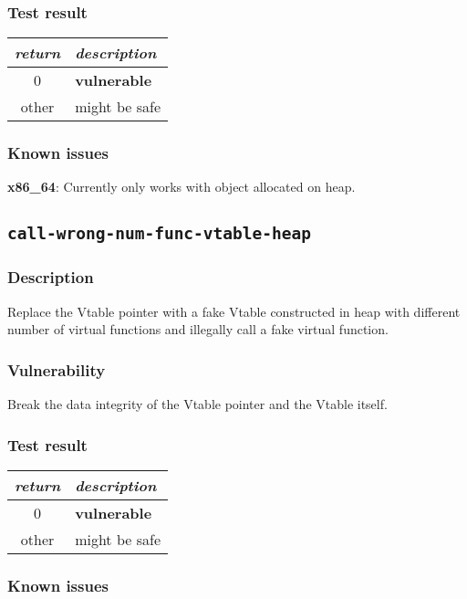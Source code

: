 \documentclass[a4paper]{book}
\begin{document}
\subsubsection{Test result}
\begin{tabular}{cl}
  \toprule
  \emph{return}  & \emph{description} \\
  \midrule
  0              & \textbf{vulnerable} \\
  other          & might be safe \\
  \bottomrule
\end{tabular}

\subsubsection{Known issues}

\textbf{x86\_64}: Currently only works with object allocated on heap.


\newpage
\subsection{\texttt{call-wrong-num-func-vtable-heap}}\label{test-call-wrong-num-func-vtable-heap}

\subsubsection{Description}
Replace the Vtable pointer with a fake Vtable constructed in heap with different number of virtual functions and
illegally call a fake virtual function.

\subsubsection{Vulnerability}
Break the data integrity of the Vtable pointer and the Vtable itself.

\subsubsection{Test result}
\begin{tabular}{cl}
  \toprule
  \emph{return}  & \emph{description} \\
  \midrule
  0              & \textbf{vulnerable} \\
  other          & might be safe \\
  \bottomrule
\end{tabular}

\subsubsection{Known issues}
\end{document}
